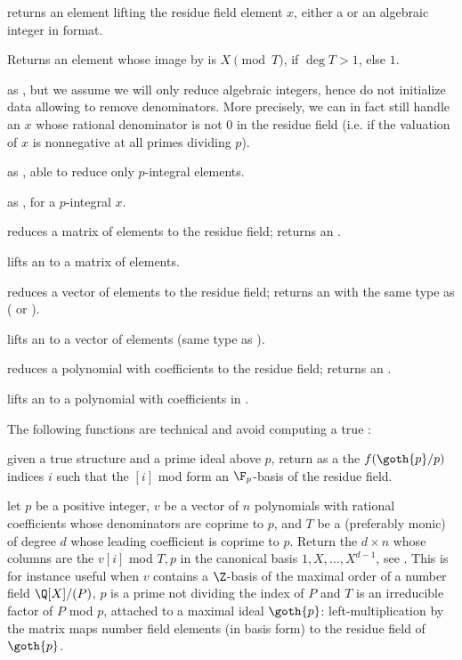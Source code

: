  returns an  element lifting
the residue field element $x$, either a  or an algebraic integer
in  format.

 Returns an  element whose image by
 is $X \pmod T$, if $\deg T>1$, else $1$.

 as , but we assume we
will only reduce algebraic integers, hence do not initialize data allowing to
remove denominators. More precisely, we can in fact still handle an $x$ whose
rational denominator is not $0$ in the residue field (i.e. if the valuation
of $x$ is nonnegative at all primes dividing $p$).

 as
, able to reduce only $p$-integral elements.

 as , for
a $p$-integral $x$.

 reduces a matrix
of  elements to the residue field; returns an .

 lifts an  to a matrix of
 elements.

 reduces a vector
of  elements to the residue field; returns an 
with the same type as  ( or ).

 lifts an  to a vector of
 elements (same type as ).

 reduces a polynomial
with  coefficients to the residue field; returns an .

 lifts an  to a polynomial
with coefficients in .

The following functions are technical and avoid computing a true
:

 given a true  structure
and a prime ideal  above $p$, return as a  the
$f(\goth{p}/p)$ indices $i$ such that the $[i]$ mod 
form an $\F_p$-basis of the residue field.

 let $p$ be a positive integer,
$v$ be a vector of $n$ polynomials with rational coefficients whose denominators
are coprime to $p$, and $T$ be a  (preferably monic) of
degree $d$ whose leading coefficient is coprime to $p$. Return the
$d \times n$  whose columns are the $v[i]$ mod $T,p$ in the
canonical basis $1, X, \dots, X^{d-1}$, see .
This is for instance useful when $v$ contains a $\Z$-basis of the maximal
order of a number field $\Q[X]/(P)$, $p$ is a prime not dividing the index of
$P$ and $T$ is an irreducible factor of $P$ mod $p$, attached to a maximal
ideal $\goth{p}$: left-multiplication by the matrix maps number field
elements (in basis form) to the residue field of $\goth{p}$.

